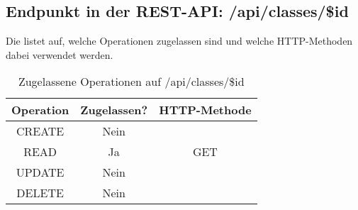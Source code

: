 \subsection{Endpunkt in der REST-API: /api/classes/\$id}
\label{sec:end:rest:api:classes:id}
Die  listet auf, welche Operationen zugelassen sind und welche HTTP-Methoden dabei verwendet werden. 

\begin{table}[!htbp]
	\begin{tabular}{|c|c|c|}
		\hline
			\textbf{Operation} & \textbf{Zugelassen?} & \textbf{HTTP-Methode} \\ \hline
			CREATE & Nein & \\ \hline 
			READ & Ja & GET \\ \hline
			UPDATE & Nein & \\ \hline 
			DELETE & Nein & \\ \hline
	\end{tabular}

		\caption{Zugelassene Operationen auf /api/classes/\$id}
		\label{tab:rest:api:classes:id:meth}
\end{table}

